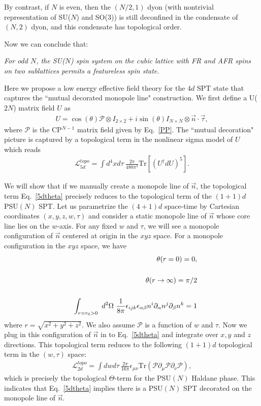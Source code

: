 \documentclass[aps,prb,twocolumn,superscriptaddress,showpacs]{revtex4}
\newcommand{\Tr}{\mathop{\mathrm{Tr}}}
\newcommand{\beqn}{\begin{eqnarray}}
\newcommand{\eeqn}{\end{eqnarray}}
\def\Tr{\text{Tr}}
\begin{document}
By contrast, if $N$ is even, then the $(N/2, 1)$ dyon (with
nontrivial representation of SU($N$) and SO(3)) is still
deconfined in the condensate of $(N, 2)$ dyon, and this condensate
has topological order.

Now we can conclude that:

{\it For odd $N$, the SU($N$) spin system on the cubic lattice
with FR and AFR spins on two sublattices permits a featureless
spin state.}

Here we propose a low energy effective field theory for the $4d$
SPT state that captures the ``mutual decorated monopole line"
construction. We first define a U($2N$) matrix field $U$ as \beqn
U = \cos(\theta) \mathcal{P} \otimes I_{2\times 2} + i
\sin(\theta) I_{N\times N} \otimes \vec{n} \cdot \vec{\tau}, \eeqn
where $\mathcal{P}$ is the CP$^{N-1}$ matrix field given by
Eq.~\ref{PP}. The ``mutual decoration" picture is captured by a
topological term in the nonlinear sigma model of $U$ which reads
\beqn \label{5dtheta} \mathcal{L}^{topo}_{5d} = \int d^4x d\tau \
\frac{2\pi }{480 \pi^3} \Tr\left[(U^\dagger dU)^5\right]. \eeqn

We will show that if we manually create a monopole line of
$\vec{n}$, the topological term Eq.~\ref{5dtheta} precisely
reduces to the topological term of the $(1+1)d$ PSU$(N)$ SPT. Let
us parametrize the $(4+1)d$ space-time by Cartesian coordinates
$(x,y,z,w,\tau)$ and consider a static monopole line of $\vec{n}$
whose core line lies on the $w$-axis. For any fixed $w$ and
$\tau$, we will see a monopole configuration of $\vec{n}$ centered
at origin in the $xyz$ space. For a monopole configuration in the
$xyz$ space, we have \beqn &&\theta(r=0)=0, \cr \cr &&
\theta(r\rightarrow\infty)=\pi/2 \cr\cr &&\int_{r=r_0>0} \
d^2\Omega \
\frac{1}{8\pi}\epsilon_{ijk}\epsilon_{\alpha\beta}n^i\partial_{\alpha}n^j\partial_{\beta}n^k=1
\eeqn where $r=\sqrt{x^2+y^2+z^2}$. We also assume $\mathcal{P}$
is a function of $w$ and $\tau$. Now we plug in this configuration
of $\vec{n}$ in to Eq.~\ref{5dtheta} and integrate over $x,y$ and
$z$ directions. This topological term reduces to the following
$(1+1)d$ topological term in the $(w,\tau)$ space: \beqn
\mathcal{L}^{topo}_{2d} = \int dwd\tau \ \frac{2\pi
}{16\pi}\epsilon_{\mu\nu}\Tr\left(\mathcal{P}\partial_{\mu}\mathcal{P}\partial_{\nu}\mathcal{P}\right),\eeqn
which is precisely the topological $\Theta$-term for the PSU$(N)$
Haldane phase. This indicates that Eq.~\ref{5dtheta} implies there
is a PSU$(N)$ SPT decorated on the monopole line of $\vec{n}$.
\end{document}
